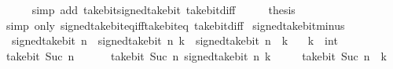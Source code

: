 \begin{isabellebody}
\ \ \ \ \isamarkupfalse%
\ {\isacharparenleft}{\kern0pt}simp\ add{\isacharcolon}{\kern0pt}\ take{\isacharunderscore}{\kern0pt}bit{\isacharunderscore}{\kern0pt}signed{\isacharunderscore}{\kern0pt}take{\isacharunderscore}{\kern0pt}bit\ take{\isacharunderscore}{\kern0pt}bit{\isacharunderscore}{\kern0pt}diff{\isacharparenright}{\kern0pt}\isanewline
\ \ \isamarkupfalse%
\ \isamarkupfalse%
\ {\isacharquery}{\kern0pt}thesis\isanewline
\ \ \ \ \isamarkupfalse%
\ {\isacharparenleft}{\kern0pt}simp\ only{\isacharcolon}{\kern0pt}\ signed{\isacharunderscore}{\kern0pt}take{\isacharunderscore}{\kern0pt}bit{\isacharunderscore}{\kern0pt}eq{\isacharunderscore}{\kern0pt}iff{\isacharunderscore}{\kern0pt}take{\isacharunderscore}{\kern0pt}bit{\isacharunderscore}{\kern0pt}eq\ take{\isacharunderscore}{\kern0pt}bit{\isacharunderscore}{\kern0pt}diff{\isacharparenright}{\kern0pt}\isanewline
{}\isamarkupfalse%
%
\endisatagproof
{\isafoldproof}%
%
\isadelimproof
\isanewline
%
\endisadelimproof
\isanewline
{}\isamarkupfalse%
\ signed{\isacharunderscore}{\kern0pt}take{\isacharunderscore}{\kern0pt}bit{\isacharunderscore}{\kern0pt}minus{\isacharcolon}{\kern0pt}\isanewline
\ \ {\isacartoucheopen}signed{\isacharunderscore}{\kern0pt}take{\isacharunderscore}{\kern0pt}bit\ n\ {\isacharparenleft}{\kern0pt}{\isacharminus}{\kern0pt}\ signed{\isacharunderscore}{\kern0pt}take{\isacharunderscore}{\kern0pt}bit\ n\ k{\isacharparenright}{\kern0pt}\ {\isacharequal}{\kern0pt}\ signed{\isacharunderscore}{\kern0pt}take{\isacharunderscore}{\kern0pt}bit\ n\ {\isacharparenleft}{\kern0pt}{\isacharminus}{\kern0pt}\ k{\isacharparenright}{\kern0pt}{\isacartoucheclose}\isanewline
\ \ \ k\ {\isacharcolon}{\kern0pt}{\isacharcolon}{\kern0pt}\ int\isanewline
%
\isadelimproof
%
\endisadelimproof
%
\isatagproof
{}\isamarkupfalse%
\ {\isacharminus}{\kern0pt}\isanewline
\ \ \isamarkupfalse%
\ {\isacartoucheopen}take{\isacharunderscore}{\kern0pt}bit\ {\isacharparenleft}{\kern0pt}Suc\ n{\isacharparenright}{\kern0pt}\isanewline
\ \ \ \ \ {\isacharparenleft}{\kern0pt}{\isacharminus}{\kern0pt}\ take{\isacharunderscore}{\kern0pt}bit\ {\isacharparenleft}{\kern0pt}Suc\ n{\isacharparenright}{\kern0pt}\ {\isacharparenleft}{\kern0pt}signed{\isacharunderscore}{\kern0pt}take{\isacharunderscore}{\kern0pt}bit\ n\ k{\isacharparenright}{\kern0pt}{\isacharparenright}{\kern0pt}\ {\isacharequal}{\kern0pt}\isanewline
\ \ \ \ take{\isacharunderscore}{\kern0pt}bit\ {\isacharparenleft}{\kern0pt}Suc\ n{\isacharparenright}{\kern0pt}\ {\isacharparenleft}{\kern0pt}{\isacharminus}{\kern0pt}\ k{\isacharparenright}{\kern0pt}{\isacartoucheclose}\isanewline

\end{isabellebody}
